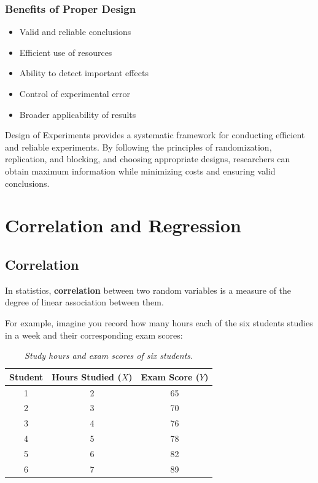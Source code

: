 \documentclass[twoside]{book}
\begin{document}
\subsection{Benefits of Proper Design}

\begin{itemize}
    \item Valid and reliable conclusions
    \item Efficient use of resources
    \item Ability to detect important effects
    \item Control of experimental error
    \item Broader applicability of results
\end{itemize}

Design of Experiments provides a systematic framework for conducting efficient and reliable experiments. By following the principles of randomization, replication, and blocking, and choosing appropriate designs, researchers can obtain maximum information while minimizing costs and ensuring valid conclusions.



\chapter{Correlation and Regression}

\section{Correlation}

\begin{textbox}
In statistics, \textbf{correlation} between two random variables is a measure of the degree of linear association between them.
\end{textbox}
 For example, imagine you record how many hours each of the six students studies in a week and their corresponding exam scores:

\begin{table}[h!]
	\centering
	\begin{tabular}{c|c|c}
		\toprule
		\textbf{Student} & \textbf{Hours Studied} ($X$) & \textbf{Exam Score} ($Y$) \\
		\midrule
		1 & 2 & 65 \\
		2 & 3 & 70 \\
		3 & 4 & 76 \\
		4 & 5 & 78 \\
		5 & 6 & 82 \\
		6 & 7 & 89 \\
		\bottomrule
	\end{tabular}
	\caption{\textit{Study hours and exam scores of six students.}}
	\label{tab:study_scores}
\end{table}
\end{document}
